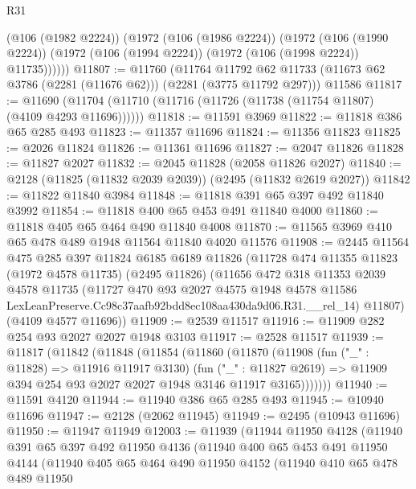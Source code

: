 \begin{lexlean}{R31}
\begin{coremodule}
        (@106 (@1982 @2224))
        (@1972
          (@106 (@1986 @2224))
          (@1972
            (@106 (@1990 @2224))
            (@1972 (@106 (@1994 @2224)) (@1972 (@106 (@1998 @2224)) @11735))))))
@11807 := @11760
    (@11764 @11792 @62 @11733 (@11673 @62 @3786 (@2281 (@11676 @62))) (@2281 (@3775 @11792 @297)))
    @11586
@11817 := @11690 (@11704 (@11710 (@11716 (@11726 (@11738 (@11754 @11807) (@4109 @4293 @11696))))))
@11818 := @11591 @3969
@11822 := @11818 @386 @65 @285 @493
@11823 := @11357 @11696
@11824 := @11356 @11823
@11825 := @2026 @11824
@11826 := @11361 @11696
@11827 := @2047 @11826
@11828 := @11827 @2027
@11832 := @2045 @11828 (@2058 @11826 @2027)
@11840 := @2128 (@11825 (@11832 @2039 @2039)) (@2495 (@11832 @2619 @2027))
@11842 := @11822 @11840 @3984
@11848 := @11818 @391 @65 @397 @492 @11840 @3992
@11854 := @11818 @400 @65 @453 @491 @11840 @4000
@11860 := @11818 @405 @65 @464 @490 @11840 @4008
@11870 := @11565 @3969 @410 @65 @478 @489 @1948 @11564 @11840 @4020 @11576
@11908 := @2445
    @11564
    @475
    @285
    @397
    @11824
    @6185
    @6189
    @11826
    (@11728
      @474
      @11355
      @11823
      (@1972 @4578 @11735)
      (@2495 @11826)
      (@11656
        @472
        @318
        @11353
        @2039
        @4578
        @11735
        (@11727
          @470
          @93
          @2027
          @4575
          @1948
          @4578
          @11586
          LexLeanPreserve.Cc98c37aafb92bdd8ec108aa430da9d06.R31.__rel_14)
        @11807)
      (@4109 @4577 @11696))
@11909 := @2539 @11517
@11916 := @11909 @282 @254 @93 @2027 @2027 @1948 @3103
@11917 := @2528 @11517
@11939 := @11817
    (@11842
      (@11848
        (@11854
          (@11860
            (@11870
              (@11908
                (fun ("_" : @11828) => @11916 @11917 @3130)
                (fun ("_" : @11827 @2619) =>
                @11909 @394 @254 @93 @2027 @2027 @1948 @3146 @11917 @3165)))))))
@11940 := @11591 @4120
@11944 := @11940 @386 @65 @285 @493
@11945 := @10940 @11696
@11947 := @2128 (@2062 @11945)
@11949 := @2495 (@10943 @11696)
@11950 := @11947 @11949
@12003 := @11939
    (@11944
      @11950
      @4128
      (@11940
        @391
        @65
        @397
        @492
        @11950
        @4136
        (@11940
          @400
          @65
          @453
          @491
          @11950
          @4144
          (@11940
            @405
            @65
            @464
            @490
            @11950
            @4152
            (@11940
              @410
              @65
              @478
              @489
              @11950

\end{coremodule}
\end{lexlean}
